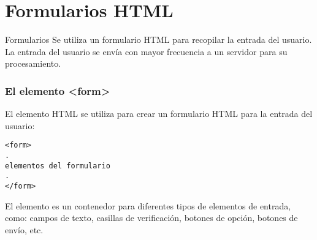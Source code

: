
\section{Formularios HTML}

\begin{frame}[c]{Formularios}
  Se utiliza un formulario HTML para recopilar la entrada del usuario.
  La entrada del usuario se envía con mayor frecuencia a un servidor
  para su procesamiento.
\end{frame}

\begin{frame}[fragile]
  \frametitle{El elemento <form>}

  El elemento HTML  se utiliza para crear un
  formulario HTML para la entrada del usuario:

  \vspace{\baselineskip}
  \begin{lstlisting}
<form>
.
elementos del formulario
.
</form>
  \end{lstlisting}

  \vspace{\baselineskip}
  El elemento  es un contenedor para diferentes tipos de
  elementos de entrada, como: campos de texto, casillas de verificación,
  botones de opción, botones de envío, etc.
\end{frame}

